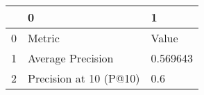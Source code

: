 \begin{tabular}{lll}
\toprule
{} &                       0 &         1 \\
\midrule
0 &                  Metric &     Value \\
1 &       Average Precision &  0.569643 \\
2 &  Precision at 10 (P@10) &       0.6 \\
\bottomrule
\end{tabular}
